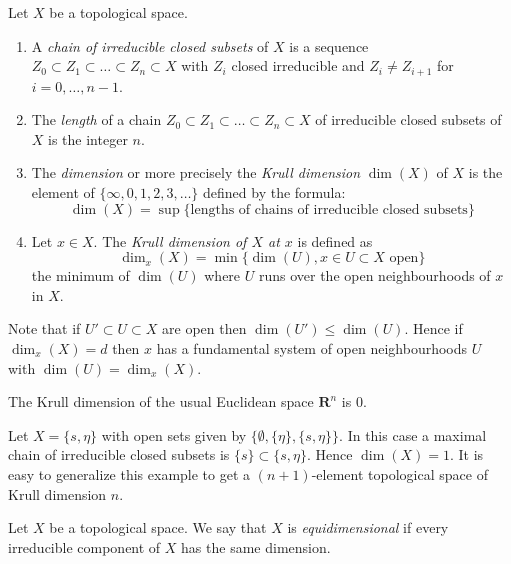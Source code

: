 \begin{definition}
\label{definition-Krull}
Let $X$ be a topological space.
\begin{enumerate}
\item A {\it chain of irreducible closed subsets} of $X$
is a sequence $Z_0 \subset Z_1 \subset \ldots \subset Z_n \subset X$
with $Z_i$ closed irreducible and $Z_i \not= Z_{i + 1}$ for
$i = 0, \ldots, n - 1$.
\item The {\it length} of a chain
$Z_0 \subset Z_1 \subset \ldots \subset Z_n \subset X$
of irreducible closed subsets of $X$ is the
integer $n$.
\item The {\it dimension} or more precisely the
{\it Krull dimension} $\dim(X)$ of $X$ is
the element of $\{\infty, 0, 1, 2, 3, \ldots\}$ defined by the formula:
$$
\dim(X) =
\sup \{\text{lengths of chains of irreducible closed subsets}\}
$$
\item Let $x \in X$.
The {\it Krull dimension of $X$ at $x$} is defined as
$$
\dim_x(X) = \min \{\dim(U), x\in U\subset X\text{ open}\}
$$
the minimum of $\dim(U)$ where $U$ runs over the open
neighbourhoods of $x$ in $X$.
\end{enumerate}
\end{definition}

\noindent
Note that if $U' \subset U \subset X$ are open then
$\dim(U') \leq \dim(U)$. Hence if $\dim_x(X) = d$ then $x$
has a fundamental system of open neighbourhoods $U$ with
$\dim(U) = \dim_x(X)$.

\begin{example}
\label{example-Krull-Rn}
The Krull dimension of the usual Euclidean space
$\mathbf{R}^n$ is $0$.
\end{example}

\begin{example}
\label{example-krull-2set}
Let $X = \{s, \eta\}$ with open sets given
by $\{\emptyset, \{\eta\}, \{s, \eta\}\}$.
In this case a maximal chain of irreducible
closed subsets is $\{s\} \subset \{s, \eta\}$.
Hence $\dim(X) = 1$. It is easy to generalize
this example to get a $(n + 1)$-element topological
space of Krull dimension $n$.
\end{example}

\begin{definition}
\label{definition-equidimensional}
Let $X$ be a topological space.
We say that $X$ is {\it equidimensional} if every irreducible
component of $X$ has the same dimension.
\end{definition}





